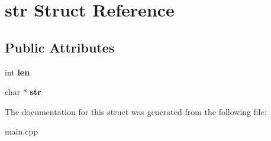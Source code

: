 \hypertarget{structstr}{}\section{str Struct Reference}
\label{structstr}
\subsection*{Public Attributes}
\begin{DoxyCompactItemize}
\item 
\mbox{\label{structstr_ad02718189d64ca962a4c888cd23bb18c}} 
int {\bfseries len}
\item 
\mbox{\label{structstr_ab12b9bc036f2cc6c9181a62d771ea65a}} 
char $\ast$ {\bfseries str}
\end{DoxyCompactItemize}


The documentation for this struct was generated from the following file\+:\begin{DoxyCompactItemize}
\item 
main.\+cpp\end{DoxyCompactItemize}
